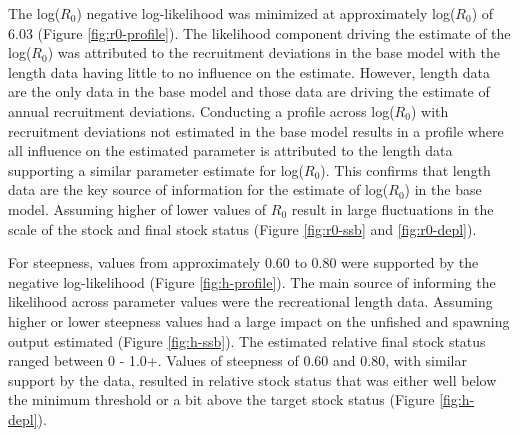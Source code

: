 \documentclass[11pt,
  english,
  a4paper,
]{article}
\begin{document}
The log({\(R_0\)\leavevmode\tagmcend\tagstructend}) negative log-likelihood was minimized at approximately log({\(R_0\)\leavevmode\tagmcend\tagstructend}) of 6.03 (Figure \ref{fig:r0-profile}). The likelihood component driving the estimate of the log({\(R_0\)\leavevmode\tagmcend\tagstructend}) was attributed to the recruitment deviations in the base model with the length data having little to no influence on the estimate. However, length data are the only data in the base model and those data are driving the estimate of annual recruitment deviations. Conducting a profile across log({\(R_0\)\leavevmode\tagmcend\tagstructend}) with recruitment deviations not estimated in the base model results in a profile where all influence on the estimated parameter is attributed to the length data supporting a similar parameter estimate for log({\(R_0\)\leavevmode\tagmcend\tagstructend}). This confirms that length data are the key source of information for the estimate of log({\(R_0\)\leavevmode\tagmcend\tagstructend}) in the base model. Assuming higher of lower values of {\(R_0\)\leavevmode\tagmcend\tagstructend} result in large fluctuations in the scale of the stock and final stock status (Figure \ref{fig:r0-ssb} and \ref{fig:r0-depl}).

\leavevmode\tagmcend\tagstructend\par


For steepness, values from approximately 0.60 to 0.80 were supported by the negative log-likelihood (Figure \ref{fig:h-profile}). The main source of informing the likelihood across parameter values were the recreational length data. Assuming higher or lower steepness values had a large impact on the unfished and spawning output estimated (Figure \ref{fig:h-ssb}). The estimated relative final stock status ranged between 0 - 1.0+. Values of steepness of 0.60 and 0.80, with similar support by the data, resulted in relative stock status that was either well below the minimum threshold or a bit above the target stock status (Figure \ref{fig:h-depl}).

\leavevmode\tagmcend\tagstructend\par
\end{document}
